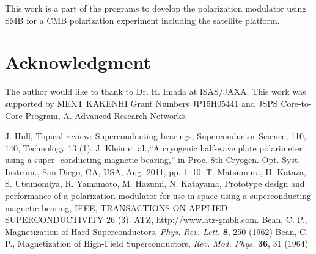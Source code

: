 \documentclass[journal]{IEEEtran}
\begin{document}
This work is a part of the programs to develop the polarization modulator using SMB for a CMB polarization experiment including the satellite platform.


\section*{Acknowledgment}
The author would like to thank to Dr. H. Imada at ISAS/JAXA. This work was supported by MEXT KAKENHI Grant Numbers JP15H05441 and JSPS Core-to-Core Program, A. Advanced Research Networks.

\ifCLASSOPTIONcaptionsoff
  \newpage
\fi





%
%
%
\begin{thebibliography}{99}

J. Hull, Topical review: Superconducting bearings, Superconductor Science, 110, 140, Technology 13 (1).
J. Klein et al.,“A cryogenic half-wave plate polarimeter using a super- conducting magnetic bearing,” in Proc. 8th Cryogen. Opt. Syst. Instrum., San Diego, CA, USA, Aug. 2011, pp. 1–10.
T. Matsumura, H. Kataza, S. Utsunomiya, R. Yamamoto, M. Hazumi, N. Katayama, Prototype design and performance of a polarization modulator for use in space using a superconducting magnetic bearing, IEEE, TRANSACTIONS ON APPLIED SUPERCONDUCTIVITY 26 (3).
ATZ, http://www.atz-gmbh.com.
Bean, C. P., Magnetization of Hard Superconductors, {\em Phys. Rev. Lett.\/} {\bf 8}, 250 (1962)
Bean, C. P., Magnetization of High-Field Superconductors, {\em Rev. Mod. Phys.\/} {\bf 36}, 31 (1964)
\end{thebibliography}
\end{document}
